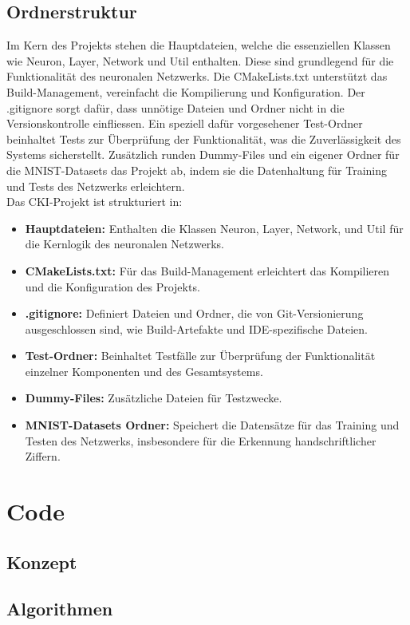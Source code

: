 \subsection{Ordnerstruktur}
\label{sec:RealOrdnerstruktur}
Im Kern des Projekts stehen die Hauptdateien, welche die essenziellen Klassen wie Neuron, Layer, Network und Util enthalten. Diese sind grundlegend für die Funktionalität des neuronalen Netzwerks. Die CMakeLists.txt unterstützt das Build-Management, vereinfacht die Kompilierung und Konfiguration. Der .gitignore sorgt dafür, dass unnötige Dateien und Ordner nicht in die Versionskontrolle einfliessen. Ein speziell dafür vorgesehener Test-Ordner beinhaltet Tests zur Überprüfung der Funktionalität, was die Zuverlässigkeit des Systems sicherstellt. Zusätzlich runden Dummy-Files und ein eigener Ordner für die MNIST-Datasets das Projekt ab, indem sie die Datenhaltung für Training und Tests des Netzwerks erleichtern. 
\\
Das CKI-Projekt ist strukturiert in:
\begin{itemize}
	\item \textbf{Hauptdateien:} 
	Enthalten die Klassen Neuron, Layer, Network, und Util für die Kernlogik des neuronalen Netzwerks.
  \item \textbf{CMakeLists.txt:} 
	Für das Build-Management erleichtert das Kompilieren und die Konfiguration des Projekts.
  \item \textbf{.gitignore:} 
	Definiert Dateien und Ordner, die von Git-Versionierung ausgeschlossen sind, wie Build-Artefakte und IDE-spezifische Dateien.
  \item \textbf{Test-Ordner:} 
	Beinhaltet Testfälle zur Überprüfung der Funktionalität einzelner Komponenten und des Gesamtsystems.
	\item \textbf{Dummy-Files:} 
	Zusätzliche Dateien für Testzwecke.
	\item \textbf{MNIST-Datasets Ordner:} 
	Speichert die Datensätze für das Training und Testen des Netzwerks, insbesondere für die Erkennung handschriftlicher Ziffern.
\end{itemize}

\section{Code}
\subsection{Konzept}

\subsection{Algorithmen}
